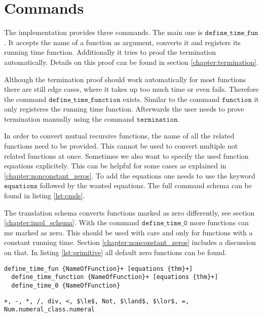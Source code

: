 

\section{Commands}\label{chapter:commands}

The implementation provides three commands.
The main one is $\texttt{define\_time\_fun}$.
It accepts the name of a function as argument, converts it and registers its running time function.
Additionally it tries to proof the termination automatically.
Details on this proof can be found in section \ref{chapter:termination}.

Although the termination proof should work automatically for most functions there are still edge cases, where it takes up too much time or even fails.
Therefore the command $\texttt{define\_time\_function}$ exists.
Similar to the command $\texttt{function}$ it only registeres the running time function.
Afterwards the user needs to prove termination manually using the command $\texttt{termination}$.

In order to convert mutual recursive functions, the name of all the related functions need to be provided.
This cannot be used to convert multiple not related functions at once.
Sometimes we also want to specify the used function equations explicitely.
This can be helpful for some cases as explained in \ref{chapter:nonconstant_zeros}.
To add the equations one needs to use the keyword $\texttt{equations}$ followed by the wanted equations.
The full command schema can be found in listing \ref{lst:cmds}.

The translation schema converts functions marked as zero differently, see section \ref{chapter:impl_schema}.
With the command $\texttt{define\_time\_0}$ more functions can me marked as zero.
This should be used with care and only for functions with a constant running time.
Section \ref{chapter:nonconstant_zeros} includes a discussion on that.
In listing \ref{lst:primitive} all default zero functions can be found.

\begin{lstlisting}[float,label=lst:cmds,caption=Schema of implemented command]
  define_time_fun {NameOfFunction}+ [equations {thm}+]
  define_time_function {NameOfFunction}+ [equations {thm}+]
  define_time_0 {NameOfFunction}
\end{lstlisting}

\begin{lstlisting}[float,label=lst:primitive,caption=Zero functions by default,mathescape=true]
  +, -, *, /, div, <, $\le$, Not, $\land$, $\lor$, =, Num.numeral_class.numeral
\end{lstlisting}

